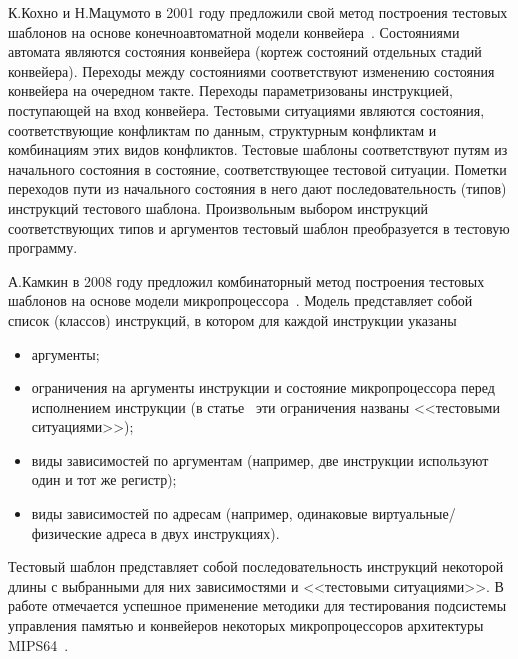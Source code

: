 
К.Кохно и Н.Мацумото в 2001 году предложили свой метод построения тестовых шаблонов на основе конечноавтоматной модели конвейера~\cite{mVpGen}. Состояниями автомата являются состояния конвейера (кортеж состояний отдельных стадий конвейера). Переходы между состояниями соответствуют изменению состояния конвейера на очередном такте. Переходы параметризованы инструкцией, поступающей на вход конвейера. Тестовыми ситуациями являются состояния, соответствующие конфликтам по данным, структурным конфликтам и комбинациям этих видов конфликтов. Тестовые шаблоны соответствуют путям из начального состояния в состояние, соответствующее тестовой ситуации. Пометки переходов пути из начального состояния в него дают последовательность (типов) инструкций тестового шаблона. Произвольным выбором инструкций соответствующих типов и аргументов тестовый шаблон преобразуется в тестовую программу.

А.Камкин в 2008 году предложил комбинаторный метод построения тестовых шаблонов на основе модели микропроцессора~\cite{MicroTESK}. Модель представляет собой список (классов) инструкций, в котором для каждой инструкции указаны
\begin{itemize}
\item аргументы;
\item ограничения на аргументы инструкции и состояние микропроцессора перед исполнением инструкции (в статье~\cite{MicroTESK} эти ограничения названы <<тестовыми ситуациями>>);
\item виды зависимостей по аргументам (например, две инструкции используют один и тот же регистр);
\item виды зависимостей по адресам (например, одинаковые виртуальные/физические адреса в двух инструкциях).
\end{itemize}

Тестовый шаблон представляет собой последовательность инструкций некоторой длины с выбранными для них зависимостями и <<тестовыми ситуациями>>. В работе отмечается успешное применение методики для тестирования подсистемы управления памятью и конвейеров некоторых микропроцессоров архитектуры MIPS64~\cite{mips64II}.

